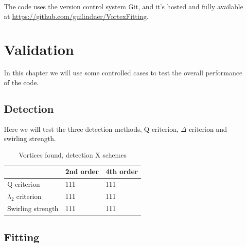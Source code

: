 \documentclass[12pt, a4paper, openany]{memoir}
\begin{document}
The code uses the version control system Git, and it's hosted and fully available at \url{https://github.com/guilindner/VortexFitting}. 


\chapter{Validation}
In this chapter we will use some controlled cases to test the overall performance of the code.

\section{Detection}
Here we will test the three detection methods, Q criterion, $\Delta$ criterion and swirling strength.  


\begin{table}[h]
	\centering
	\caption{Vortices found, detection X schemes}
	\vspace{10px}
	\label{tb:detection}
	\begin{tabular}{l|l|l}
		         & 2nd order      & 4th order  \\
		\hline
		Q criterion  & 111  & 111  \\
		$\lambda_2$ criterion & 111  & 111 \\
		Swirling strength    & 111  & 111
	\end{tabular}
\end{table}

\section{Fitting}
\end{document}
